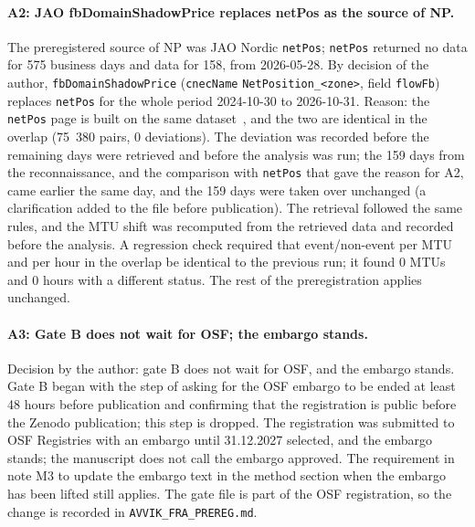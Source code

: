 \paragraph{A2: JAO fbDomainShadowPrice replaces netPos as the source of NP.}
The preregistered source of NP was JAO Nordic \texttt{netPos}; \texttt{netPos} returned no data for 575 business days and data for 158, from 2026-05-28. %
By decision of the author, \texttt{fbDomainShadowPrice} (\texttt{cnecName} \texttt{NetPosition\_<zone>}, field \texttt{flowFb}) replaces \texttt{netPos} for the whole period 2024-10-30 to 2026-10-31. %
Reason: the \texttt{netPos} page is built on the same dataset~\cite{jaohb}, and the two are identical in the overlap (75~380 pairs, 0 deviations). %
The deviation was recorded before the remaining days were retrieved and before the analysis was run; the 159 days from the reconnaissance, and the comparison with \texttt{netPos} that gave the reason for A2, came earlier the same day, and the 159 days were taken over unchanged (a clarification added to the file before publication). The retrieval followed the same rules, and the MTU shift was recomputed from the retrieved data and recorded before the analysis. %
A regression check required that event/non-event per MTU and per hour in the overlap be identical to the previous run; it found 0 MTUs and 0 hours with a different status. %
The rest of the preregistration applies unchanged.

\paragraph{A3: Gate B does not wait for OSF; the embargo stands.}
Decision by the author: gate B does not wait for OSF, and the embargo stands. %
Gate B began with the step of asking for the OSF embargo to be ended at least 48 hours before publication and confirming that the registration is public before the Zenodo publication; this step is dropped. %
The registration was submitted to OSF Registries with an embargo until 31.12.2027 selected, and the embargo stands; the manuscript does not call the embargo approved. %
The requirement in note M3 to update the embargo text in the method section when the embargo has been lifted still applies. %
The gate file is part of the OSF registration, so the change is recorded in \texttt{AVVIK\_FRA\_PREREG.md}. %

